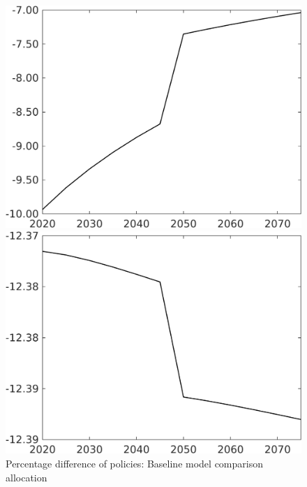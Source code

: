 \documentclass[12pt]{article}
\begin{document}
\begin{figure}[h!!]
	\centering
	\caption{Percentage difference of policies: Baseline model comparison allocation}\label{fig:Pertauf_nsk0_xgr0_notaul}
	\begin{minipage}[]{0.32\textwidth}
		\includegraphics[width=1\textwidth]{../../codding_model/own_basedOnFried/optimalPol_010922_revision/figures/all_13Sept22/CompTaufPER_bytaul_Reg0_tauf_spillover0_nsk0_xgr0_knspil0_sep1_LFlimit1_emsbase0_countec0_GovRev0_etaa0.79_lgd0.png}
	\end{minipage}		
	\begin{minipage}[]{0.32\textwidth}
	\includegraphics[width=1\textwidth]{../../codding_model/own_basedOnFried/optimalPol_010922_revision/figures/all_13Sept22/CompTaufPER_bytaul_Reg0_hh_spillover0_nsk0_xgr0_knspil0_sep1_LFlimit1_emsbase0_countec0_GovRev0_etaa0.79_lgd0.png}

\end{minipage}
\end{figure}
\end{document}
